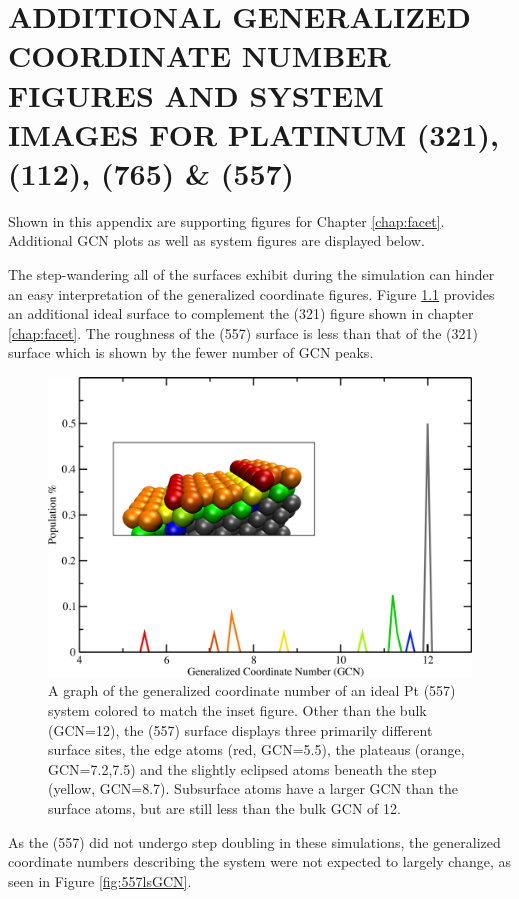 
\chapter{ADDITIONAL GENERALIZED COORDINATE NUMBER FIGURES AND SYSTEM IMAGES FOR PLATINUM (321), (112), (765) \& (557)}
\label{app:SI2}


Shown in this appendix are supporting figures for Chapter \ref{chap:facet}.
Additional GCN plots as well as system figures are displayed below.
\newpage



The step-wandering all of the surfaces exhibit during the simulation can hinder
an easy interpretation of the generalized coordinate figures. Figure
\ref{fig:557GCN} provides an additional ideal surface to complement the (321)
figure shown in chapter \ref{chap:facet}. The roughness of the (557) surface is
less than that of the (321) surface which is shown by the fewer number of GCN
peaks. 

\begin{figure}
\centering
\includegraphics[width=0.9\linewidth]{../figures/appB/557_ideal_gcn.pdf}
\caption{A graph of the generalized coordinate number of an ideal Pt (557)
system colored to match the inset figure. Other than the bulk (GCN=12), the
(557) surface displays three primarily different surface sites, the edge atoms
(red, GCN=5.5), the plateaus (orange, GCN=7.2,7.5) and the slightly eclipsed
atoms beneath the step (yellow, GCN=8.7). Subsurface atoms have a larger GCN
than the surface atoms, but are still less than the bulk GCN of 12.}
\label{fig:557GCN}
\end{figure}
\newpage


As the  (557) did not undergo step doubling in these simulations, the
generalized coordinate numbers describing the system were not expected to
largely change, as seen in Figure \ref{fig:557lsGCN}.

